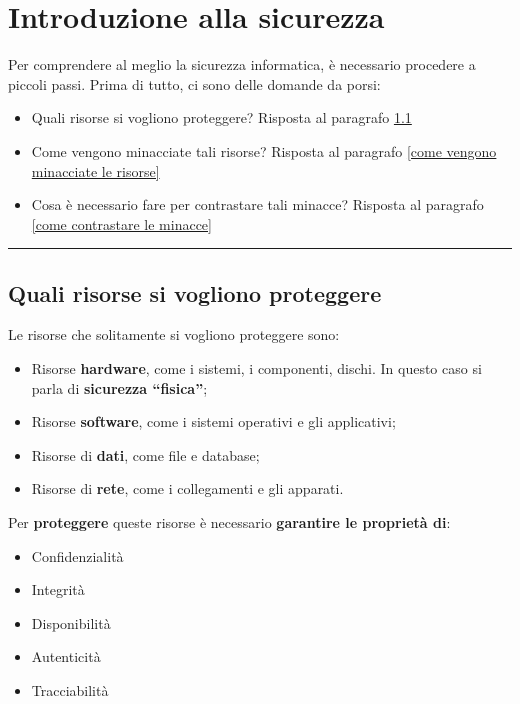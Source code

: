 \documentclass[a4paper]{article}
\newcommand{\longline}{\noindent\rule{\textwidth}{0.4pt}}
\newcommand{\dquotes}[1]{``#1''}
\begin{document}
	\section{Introduzione alla sicurezza}
	
	Per comprendere al meglio la sicurezza informatica, è necessario procedere a piccoli passi. Prima di tutto, ci sono delle domande da porsi:
	\begin{itemize}
		\item Quali risorse si vogliono proteggere? Risposta al paragrafo \ref{quali risorse si vogliono proteggere}
		\item Come vengono minacciate tali risorse? Risposta al paragrafo \ref{come vengono minacciate le risorse}
		\item Cosa è necessario fare per contrastare tali minacce? Risposta al paragrafo \ref{come contrastare le minacce}
	\end{itemize}

	\longline
	
	\subsection{Quali risorse si vogliono proteggere}\label{quali risorse si vogliono proteggere}
	
	Le risorse che solitamente si vogliono proteggere sono:
	\begin{itemize}
		\item Risorse \textbf{hardware}, come i sistemi, i componenti, dischi. In questo caso si parla di \textbf{sicurezza \dquotes{fisica}};
		
		\item Risorse \textbf{software}, come i sistemi operativi e gli applicativi;
		
		\item Risorse di \textbf{dati}, come file e database;
		
		\item Risorse di \textbf{rete}, come i collegamenti e gli apparati.
	\end{itemize}
	Per \textcolor{Red3}{\textbf{proteggere}} queste risorse è necessario \textbf{garantire le proprietà di}:
	\begin{itemize}
		\item Confidenzialità
		\item Integrità
		\item Disponibilità
		\item Autenticità
		\item Tracciabilità
	\end{itemize}
	
\end{document}
